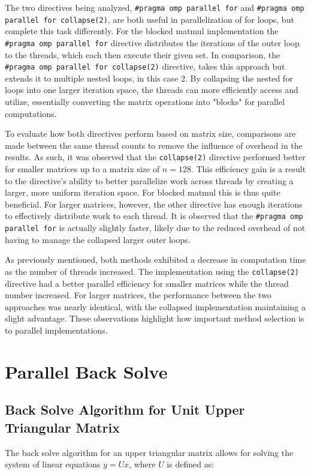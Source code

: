 \documentclass{article}
\begin{document}
\bigskip
\noindent
The two directives being analyzed, \texttt{\#pragma omp parallel for} and \texttt{\#pragma omp parallel for collapse(2)}, are both useful in parallelization of for loops, but complete this task differently. For the blocked matmul implementation the \texttt{\#pragma omp parallel for} directive distributes the iterations of the outer loop to the threads, which each then execute their given set. In comparison, the \texttt{\#pragma omp parallel for collapse(2)} directive, takes this approach but extends it to multiple nested loops, in this case 2. By collapsing the nested for loops into one larger iteration space, the threads can more efficiently access and utilize, essentially converting the matrix operations into "blocks" for parallel computations. 

\bigskip
\noindent
To evaluate how both directives perform based on matrix size, comparisons are made between the same thread counts to remove the influence of overhead in the results. As such, it was observed that the \texttt{collapse(2)} directive performed better for smaller matrices up to a matrix size of $n = 128$. This efficiency gain is a result to the directive's ability to better parallelize work across threads by creating a larger, more uniform iteration space. For blocked matmul this is thus quite beneficial. For larger matrices, however, the other directive has enough iterations to effectively distribute work to each thread. It is observed that the \texttt{\#pragma omp parallel for} is actually slightly faster, likely due to the reduced overhead of not having to manage the collapsed larger outer loops. 

\bigskip
\noindent
As previously mentioned, both methods exhibited a decrease in computation time as the number of threads increased. The implementation using the \texttt{collapse(2)} directive had a better parallel efficiency for smaller matrices while the thread number increased. For larger matrices, the performance between the two approaches was nearly identical, with the collapsed implementation maintaining a slight advantage. These observations highlight how important method selection is to parallel implementations. 

\section{Parallel Back Solve}
\subsection{Back Solve Algorithm for Unit Upper Triangular Matrix}
The back solve algorithm for an upper triangular matrix allows for solving the system of linear equations \(y = Ux\), where \(U\) is defined as:
\end{document}
